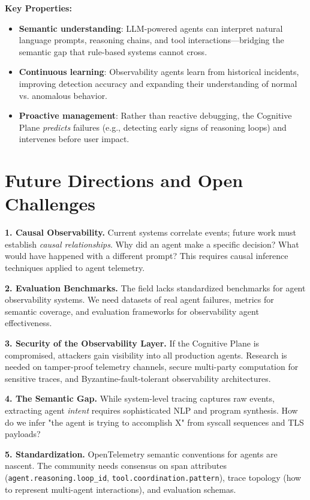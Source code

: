 \documentclass[sigplan,screen,review,9pt]{acmart}
\begin{document}
\textbf{Key Properties:}
\begin{itemize}
  \item \textbf{Semantic understanding}: LLM-powered agents can interpret natural language prompts, reasoning chains, and tool interactions—bridging the semantic gap that rule-based systems cannot cross.

  \item \textbf{Continuous learning}: Observability agents learn from historical incidents, improving detection accuracy and expanding their understanding of normal vs. anomalous behavior.

  \item \textbf{Proactive management}: Rather than reactive debugging, the Cognitive Plane \emph{predicts} failures (e.g., detecting early signs of reasoning loops) and intervenes before user impact.
\end{itemize}

\section{Future Directions and Open Challenges}

\textbf{1. Causal Observability.} Current systems correlate events; future work must establish \emph{causal relationships}. Why did an agent make a specific decision? What would have happened with a different prompt? This requires causal inference techniques applied to agent telemetry.

\textbf{2. Evaluation Benchmarks.} The field lacks standardized benchmarks for agent observability systems. We need datasets of real agent failures, metrics for semantic coverage, and evaluation frameworks for observability agent effectiveness.

\textbf{3. Security of the Observability Layer.} If the Cognitive Plane is compromised, attackers gain visibility into all production agents. Research is needed on tamper-proof telemetry channels, secure multi-party computation for sensitive traces, and Byzantine-fault-tolerant observability architectures.

\textbf{4. The Semantic Gap.} While system-level tracing captures raw events, extracting agent \emph{intent} requires sophisticated NLP and program synthesis. How do we infer "the agent is trying to accomplish X" from syscall sequences and TLS payloads?

\textbf{5. Standardization.} OpenTelemetry semantic conventions for agents are nascent. The community needs consensus on span attributes (\texttt{agent.reasoning.loop\_id}, \texttt{tool.coordination.pattern}), trace topology (how to represent multi-agent interactions), and evaluation schemas.
\end{document}
